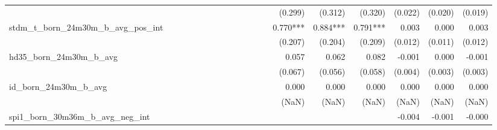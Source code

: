 \begin{tabular}{lrrrrrrrrrrrrrrrrrr}
                                            &              &              &              &              &              &              &              &              &               &              &              &               &      (0.299) &      (0.312) &       (0.320) &      (0.022) &      (0.020) &       (0.019) \\ 
stdm\_t\_born\_24m30m\_b\_avg\_pos\_int     &              &              &              &              &              &              &              &              &               &              &              &               &     0.770*** &     0.884*** &      0.791*** &        0.003 &        0.000 &         0.003 \\ 
                                            &              &              &              &              &              &              &              &              &               &              &              &               &      (0.207) &      (0.204) &       (0.209) &      (0.012) &      (0.011) &       (0.012) \\ 
hd35\_born\_24m30m\_b\_avg                  &              &              &              &              &              &              &              &              &               &              &              &               &        0.057 &        0.062 &         0.082 &       -0.001 &        0.000 &        -0.001 \\ 
                                            &              &              &              &              &              &              &              &              &               &              &              &               &      (0.067) &      (0.056) &       (0.058) &      (0.004) &      (0.003) &       (0.003) \\ 
id\_born\_24m30m\_b\_avg                    &              &              &              &              &              &              &              &              &               &              &              &               &        0.000 &        0.000 &         0.000 &        0.000 &        0.000 &         0.000 \\ 
                                            &              &              &              &              &              &              &              &              &               &              &              &               &        (NaN) &        (NaN) &         (NaN) &        (NaN) &        (NaN) &         (NaN) \\ 
spi1\_born\_30m36m\_b\_avg\_neg\_int        &              &              &              &              &              &              &              &              &               &              &              &               &              &              &               &       -0.004 &       -0.001 &        -0.000 \\ 

\end{tabular}
